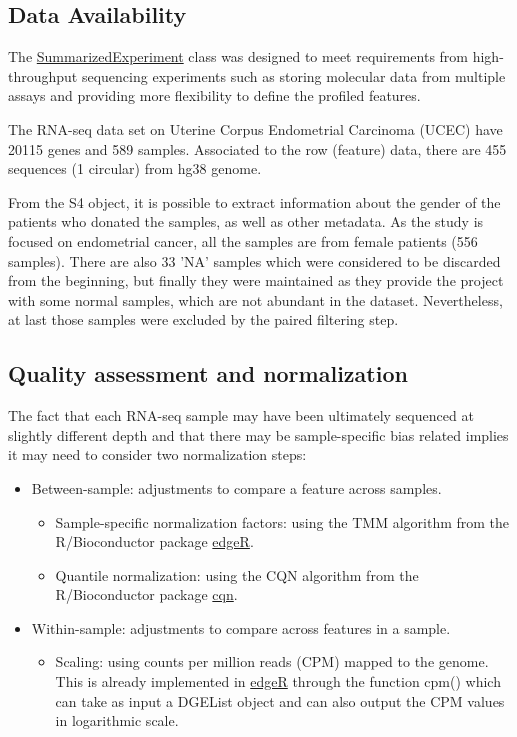 \documentclass[9pt,twocolumn,twoside]{gsajnl}
\begin{document}
\subsection*{Data Availability}
The \href{http://bioconductor.org/packages/release/bioc/html/SummarizedExperiment.html}{SummarizedExperiment} class was designed to meet requirements from high-throughput sequencing experiments such as storing molecular data from multiple assays and providing more flexibility to define the profiled features.

The RNA-seq data set on Uterine Corpus Endometrial Carcinoma (UCEC) have 20115 genes and 589 samples. Associated to the row (feature) data, there are 455 sequences (1 circular) from hg38 genome.

From the S4 object, it is possible to extract information about the gender of the patients who donated the samples, as well as other metadata. As the study is focused on endometrial cancer, all the samples are from female patients (556 samples). There are also 33 'NA' samples which were considered to be discarded from the beginning, but finally they were maintained as they provide the project with some normal samples, which are not abundant in the dataset. Nevertheless, at last those samples were excluded by the paired filtering step. 

\subsection*{Quality assessment and normalization}
The fact that each RNA-seq sample may have been ultimately sequenced at slightly different depth and that there may be sample-specific bias related implies it may need to consider two normalization steps:
\begin{itemize}
\item Between-sample: adjustments to compare a feature across samples.
\begin{itemize}
\item Sample-specific normalization factors: using the TMM algorithm from the R/Bioconductor package \href{http://bioconductor.org/packages/release/bioc/html/edgeR.html}{edgeR}.
\item Quantile normalization: using the CQN algorithm from the R/Bioconductor package \href{http://bioconductor.org/packages/release/bioc/html/cqn.html}{cqn}.
\end{itemize}
\item Within-sample: adjustments to compare across features in a sample.
\begin{itemize}
\item Scaling: using counts per million reads (CPM) mapped to the genome. This is already implemented in \href{http://bioconductor.org/packages/release/bioc/html/edgeR.html}{edgeR} through the function cpm() which can take as input a DGEList object and can also output the CPM values in logarithmic scale.
\end{itemize}
\end{itemize}
\end{document}
